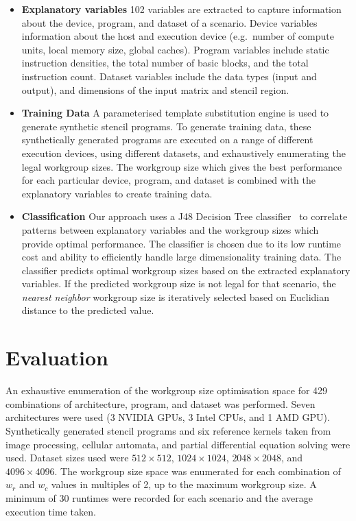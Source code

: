 \documentclass[hidelinks]{acaces}
\begin{document}
\begin{itemize}
\item \textbf{Explanatory variables} 102 variables are extracted to
  capture information about the device, program, and dataset of a
  scenario. Device variables information about the host and execution
  device (e.g.\ number of compute units, local memory size, global
  caches). Program variables include static instruction densities, the
  total number of basic blocks, and the total instruction
  count. Dataset variables include the data types (input and output),
  and dimensions of the input matrix and stencil region.
\item \textbf{Training Data} A parameterised template substitution
  engine is used to generate synthetic stencil programs. To generate
  training data, these synthetically generated programs are executed
  on a range of different execution devices, using different datasets,
  and exhaustively enumerating the legal workgroup sizes. The
  workgroup size which gives the best performance for each particular
  device, program, and dataset is combined with the explanatory
  variables to create training data.
\item \textbf{Classification} Our approach uses a J48 Decision Tree
  classifier~\cite{Han2011} to correlate patterns between explanatory
  variables and the workgroup sizes which provide optimal
  performance. The classifier is chosen due to its low runtime cost
  and ability to efficiently handle large dimensionality training
  data. The classifier predicts optimal workgroup sizes based on the
  extracted explanatory variables. If the predicted workgroup size is
  not legal for that scenario, the \emph{nearest neighbor} workgroup
  size is iteratively selected based on Euclidian distance to the
  predicted value.
\end{itemize}

\section{Evaluation}

An exhaustive enumeration of the workgroup size optimisation space for
429 combinations of architecture, program, and dataset was performed.
Seven architectures were used (3 NVIDIA GPUs, 3 Intel CPUs, and 1 AMD
GPU). Synthetically generated stencil programs and six reference
kernels taken from image processing, cellular automata, and partial
differential equation solving were used. Dataset sizes used were
$512\times512$, $1024\times1024$, $2048\times2048$, and
$4096\times4096$. The workgroup size space was enumerated for each
combination of $w_r$ and $w_c$ values in multiples of 2, up to the
maximum workgroup size. A minimum of 30 runtimes were recorded for
each scenario and the average execution time taken.
\end{document}

